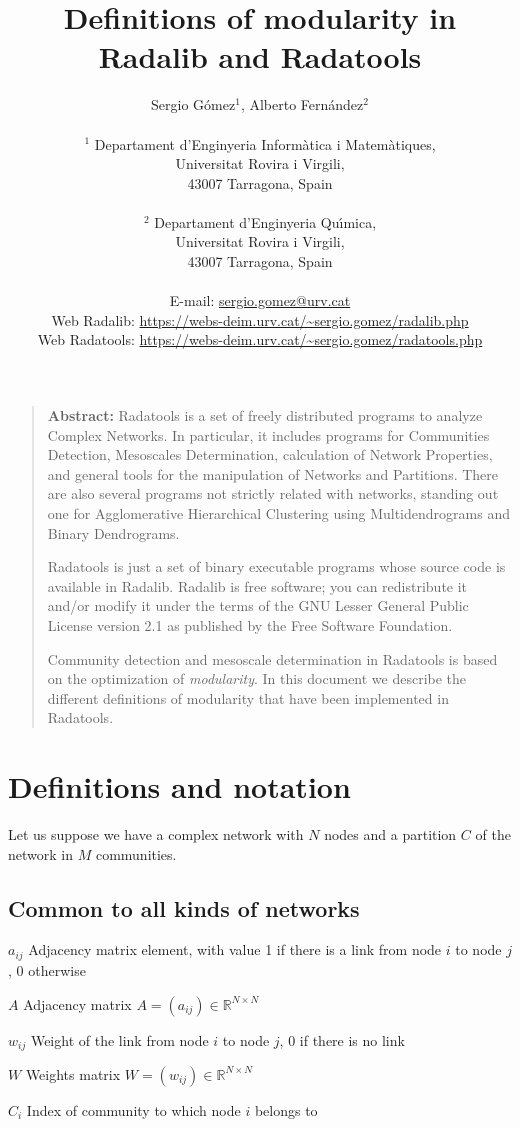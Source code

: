 \documentclass[11pt]{article}
\title{\bf \Large Definitions of modularity in {\sc Radalib} and {\sc Radatools}}
\author{Sergio G{\'o}mez$^1$, Alberto Fern{\'a}ndez$^2$\\
\\
\normalsize{$^1$ Departament d'Enginyeria Inform\`{a}tica i Matem\`{a}tiques,}\\
\normalsize{Universitat Rovira i Virgili,}\\
\normalsize{43007 Tarragona, Spain}\\
\\
\normalsize{$^2$ Departament d'Enginyeria Qu\'{\i}mica,}\\
\normalsize{Universitat Rovira i Virgili,}\\
\normalsize{43007 Tarragona, Spain}\\
\\
\normalsize{E-mail: \url{sergio.gomez@urv.cat}}\\
\normalsize{Web {\sc Radalib}: \url{https://webs-deim.urv.cat/\~sergio.gomez/radalib.php}}\\
\normalsize{Web {\sc Radatools}: \url{https://webs-deim.urv.cat/\~sergio.gomez/radatools.php}}\\
}
\date{}
\newcommand{\bdesc}[2]{\begin{basedescript}{\desclabelstyle{\pushlabel}\desclabelwidth{#1}\setlength{\labelsep}{0mm}\setlength{\leftmargin}{#2}}}
\newcommand{\edesc}{\end{basedescript}}
\begin{document}
\maketitle



\begin{quote}
{\bf Abstract:} {\sc Radatools} is a set of freely distributed programs to analyze Complex Networks. In particular, it includes programs for Communities Detection, Mesoscales Determination, calculation of Network Properties, and general tools for the manipulation of Networks and Partitions. There are also several programs not strictly related with networks, standing out one for Agglomerative Hierarchical Clustering using Multidendrograms and Binary Dendrograms.

{\sc Radatools} is just a set of binary executable programs whose source code is available in {\sc Radalib}. {\sc Radalib} is free software; you can redistribute it and/or modify it under the terms of the GNU Lesser General Public License version 2.1 as published by the Free Software Foundation.

Community detection and mesoscale determination in {\sc Radatools} is based on the optimization of {\em modularity}. In this document we describe the different definitions of modularity that have been implemented in {\sc Radatools}.
\end{quote}

\newpage


\section{Definitions and notation}

Let us suppose we have a complex network with $N$ nodes and a partition $C$ of the
network in $M$ communities.


\subsection{Common to all kinds of networks}

\bdesc{12mm}{12mm}
\item[$a_{ij}$] Adjacency matrix element, with value 1 if there is a link from node $i$ to node $j$, 0 otherwise
\item[$A$] Adjacency matrix $A = (a_{ij}) \in \mathbb{R}^{N\times N}$
\item[$w_{ij}$] Weight of the link from node $i$ to node $j$, 0 if there is no link
\item[$W$] Weights matrix $W = (w_{ij}) \in \mathbb{R}^{N\times N}$
\item[$C_i$] Index of community to which node $i$ belongs to
\edesc
\end{document}

